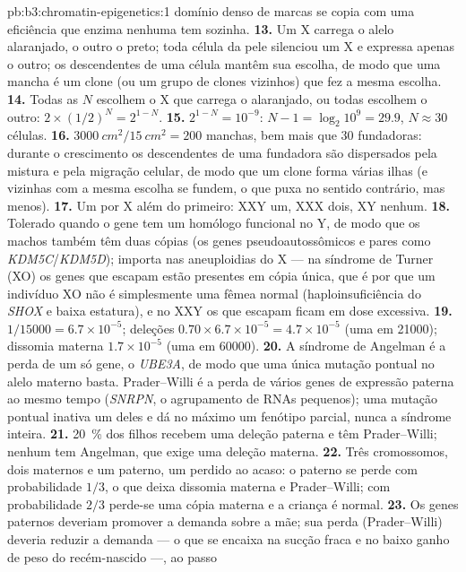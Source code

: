 \begin{solution}{pb:b3:chromatin-epigenetics:1}
domínio denso de marcas se copia com uma eficiência que enzima nenhuma
tem sozinha.
\textbf{13.} Um X carrega o alelo alaranjado, o outro o preto; toda
célula da pele silenciou um X e expressa apenas o outro; os
descendentes de uma célula mantêm sua escolha, de modo que uma mancha é
um clone (ou um grupo de clones vizinhos) que fez a mesma escolha.
\textbf{14.} Todas as $N$ escolhem o X que carrega o alaranjado, ou
todas escolhem o outro: $2\times (1/2)^{N} = 2^{1-N}$.
\textbf{15.} $2^{1-N} = 10^{-9}$: $N - 1 = \log_{2} 10^{9} = 29.9$,
$N \approx 30$ células.
\textbf{16.} $\qty{3000}{cm^2}/\qty{15}{cm^2} = 200$ manchas, bem mais
que $30$ fundadoras: durante o crescimento os descendentes de uma
fundadora são dispersados pela mistura e pela migração celular, de modo
que um clone forma várias ilhas (e vizinhas com a mesma escolha se
fundem, o que puxa no sentido contrário, mas menos).
\textbf{17.} Um  por X além do primeiro: XXY um, XXX
dois, XY nenhum.
\textbf{18.} Tolerado quando o gene tem um homólogo funcional no Y, de
modo que os machos também têm duas cópias (os genes pseudoautossômicos
e pares como \emph{KDM5C}/\emph{KDM5D}); importa nas aneuploidias do X
--- na síndrome de Turner (XO) os genes que escapam estão presentes em
cópia única, que é por que um indivíduo XO não é simplesmente uma fêmea
normal (haploinsuficiência do \emph{SHOX} e baixa estatura), e no XXY
os que escapam ficam em dose excessiva.
\textbf{19.} $1/\num{15000} = 6.7\times 10^{-5}$; deleções $0.70\times
6.7\times 10^{-5} = 4.7\times 10^{-5}$ (uma em \num{21000}); dissomia
materna $1.7\times 10^{-5}$ (uma em \num{60000}).
\textbf{20.} A síndrome de Angelman é a perda de um só gene, o
\emph{UBE3A}, de modo que uma única mutação pontual no alelo materno
basta. Prader--Willi é a perda de vários genes de expressão paterna ao
mesmo tempo (\emph{SNRPN}, o agrupamento de RNAs pequenos); uma mutação
pontual inativa um deles e dá no máximo um fenótipo parcial, nunca a
síndrome inteira.
\textbf{21.} \qty{20}{\%} dos filhos recebem uma deleção paterna e têm
Prader--Willi; nenhum tem Angelman, que exige uma deleção materna.
\textbf{22.} Três cromossomos, dois maternos e um paterno, um perdido
ao acaso: o paterno se perde com probabilidade $1/3$, o que deixa
dissomia materna e Prader--Willi; com probabilidade $2/3$ perde-se uma
cópia materna e a criança é normal.
\textbf{23.} Os genes paternos deveriam promover a demanda sobre a mãe;
sua perda (Prader--Willi) deveria reduzir a demanda --- o que se encaixa
na sucção fraca e no baixo ganho de peso do recém-nascido ---, ao passo

\end{solution}
